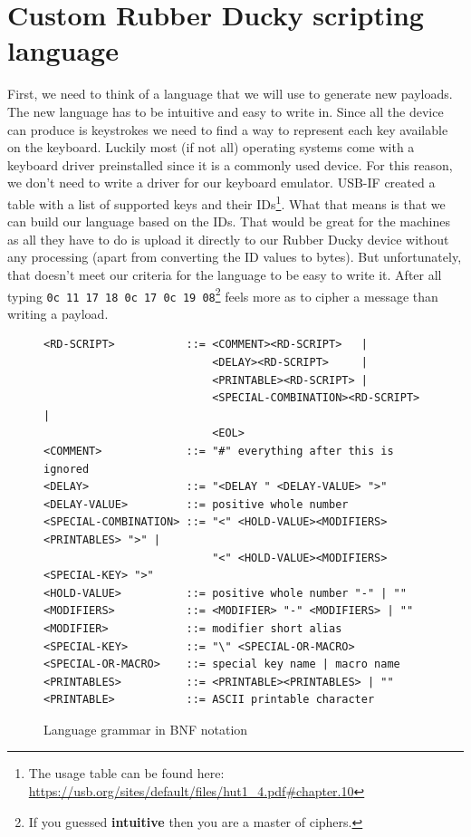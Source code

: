 \section{Custom Rubber Ducky scripting language}
\label{sec:design_language}
First, we need to think of a language that we will use to generate new payloads. The new language has to be intuitive and easy to write in. Since all the device can produce is keystrokes we need to find a way to represent each key available on the keyboard. Luckily most (if not all) operating systems come with a keyboard driver preinstalled since it is a commonly used device. For this reason, we don't need to write a driver for our keyboard emulator. \mbox{USB-IF} created a table with a list of supported keys and their IDs\footnote{The usage table can be found here: \url{https://usb.org/sites/default/files/hut1_4.pdf\#chapter.10}}. What that means is that we can build our language based on the IDs. That would be great for the machines as all they have to do is upload it directly to our Rubber Ducky device without any processing (apart from converting the ID values to bytes). But unfortunately, that doesn't meet our criteria for the language to be easy to write it. After all typing \verb|0c 11 17 18 0c 17 0c 19 08|\footnote{If you guessed \textbf{intuitive} then you are a master of ciphers.} feels more as to cipher a message than writing a payload.

\begin{figure}[ht]
\begin{small}
\begin{verbatim}
<RD-SCRIPT>           ::= <COMMENT><RD-SCRIPT>   |
                          <DELAY><RD-SCRIPT>     |
                          <PRINTABLE><RD-SCRIPT> |
                          <SPECIAL-COMBINATION><RD-SCRIPT> |
                          <EOL>
<COMMENT>             ::= "#" everything after this is ignored
<DELAY>               ::= "<DELAY " <DELAY-VALUE> ">"
<DELAY-VALUE>         ::= positive whole number
<SPECIAL-COMBINATION> ::= "<" <HOLD-VALUE><MODIFIERS><PRINTABLES> ">" |
                          "<" <HOLD-VALUE><MODIFIERS><SPECIAL-KEY> ">"
<HOLD-VALUE>          ::= positive whole number "-" | ""
<MODIFIERS>           ::= <MODIFIER> "-" <MODIFIERS> | ""
<MODIFIER>            ::= modifier short alias
<SPECIAL-KEY>         ::= "\" <SPECIAL-OR-MACRO>
<SPECIAL-OR-MACRO>    ::= special key name | macro name
<PRINTABLES>          ::= <PRINTABLE><PRINTABLES> | ""
<PRINTABLE>           ::= ASCII printable character
\end{verbatim}
\end{small}
\caption{Language grammar in BNF notation}
\label{fig:language_grammar_bnf}
\end{figure}

